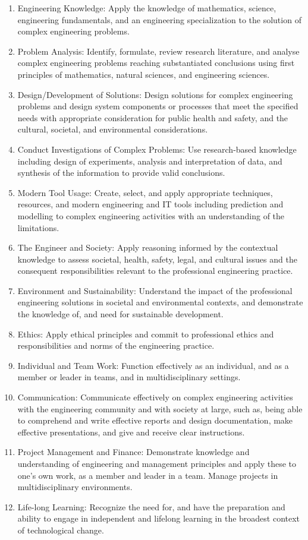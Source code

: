 \begin{enumerate}
	\item {Engineering Knowledge:} Apply the knowledge of mathematics, science, engineering fundamentals, and an engineering specialization to the solution of complex engineering problems.
	\item {Problem Analysis:} Identify, formulate, review research literature, and analyse complex engineering problems reaching substantiated conclusions using first principles of mathematics, natural sciences, and engineering sciences.
	\item {Design/Development of Solutions:} Design solutions for complex engineering problems and design system components or processes that meet the specified needs with appropriate consideration for public health and safety, and the cultural, societal, and environmental considerations.
	\item {Conduct Investigations of Complex Problems:} Use research-based knowledge including design of experiments, analysis and interpretation of data, and synthesis of the information to provide valid conclusions.
	\item {Modern Tool Usage:} Create, select, and apply appropriate techniques, resources, and modern engineering and IT tools including prediction and modelling to complex engineering activities with an understanding of the limitations.
	\item {The Engineer and Society:} Apply reasoning informed by the contextual knowledge to assess societal, health, safety, legal, and cultural issues and the consequent responsibilities relevant to the professional engineering practice.
	\item {Environment and Sustainability:} Understand the impact of the professional engineering solutions in societal and environmental contexts, and demonstrate the knowledge of, and need for sustainable development.
	\item {Ethics:} Apply ethical principles and commit to professional ethics and responsibilities and norms of the engineering practice.
	\item {Individual and Team Work:} Function effectively as an individual, and as a member or leader in teams, and in multidisciplinary settings.
	\item {Communication:} Communicate effectively on complex engineering activities with the engineering community and with society at large, such as, being able to comprehend and write effective reports and design documentation, make effective presentations, and give and receive clear instructions.
	\item {Project Management and Finance:} Demonstrate knowledge and understanding of engineering and management principles and apply these to one’s own work, as a member and leader in a team. Manage projects in multidisciplinary environments.
	\item {Life-long Learning:} Recognize the need for, and have the preparation and ability to engage in independent and lifelong learning in the broadest context of technological change.
\end{enumerate}

